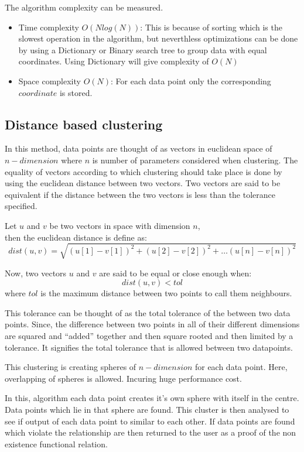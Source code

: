 The algorithm complexity can be measured. 
\begin{itemize}
	\item Time complexity \(O(N log(N))\): This is because of sorting which is the slowest operation in the algorithm, but neverthless optimizations can be done by using a Dictionary or Binary search tree to group data with equal coordinates. Using Dictionary will give complexity of \(O(N)\)
	\item Space complexity \(O(N)\): For each data point only the corresponding \(coordinate\) is stored.
\end{itemize}

\subsection{Distance based clustering}

In this method, data points are thought of as vectors in euclidean space of \(n-dimension\) where \(n\) is number of parameters considered when clustering. The equality of vectors according to which clustering should take place is done by using the euclidean distance between two vectors. Two vectors are said to be equivalent if the distance between the two vectors is less than the tolerance specified.

Let \(u\) and \(v\) be two vectors in space with dimension \(n\),\\
then the euclidean distance is define as: \\
\[dist(u, v) = \sqrt{(u[1] - v[1])^2 + (u[2] - v[2])^2 + \ldots (u[n] - v[n])^2}\]

Now, two vectors \(u\) and \(v\) are said to be equal or close enough when:\\
\[dist(u,v) < tol\]  where \(tol\) is the maximum distance between two points to call them neighbours.

This tolerance can be thought of as the total tolerance of the between two data points. Since, the difference between two points in all of their different dimensions are squared and ``added'' together and then square rooted and then limited by a tolerance. It signifies the total tolerance that is allowed between two datapoints. 

This clustering is creating spheres of \(n-dimension\) for each data point. Here, overlapping of spheres is allowed. Incuring huge performance cost.

In this, algorithm each data point creates it's own sphere with itself in the centre. Data points which lie in that sphere are found. This cluster is then analysed to see if output of each data point to similar to each other. If data points are found which violate the relationship are then returned to the user as a proof of the non existence functional relation.

